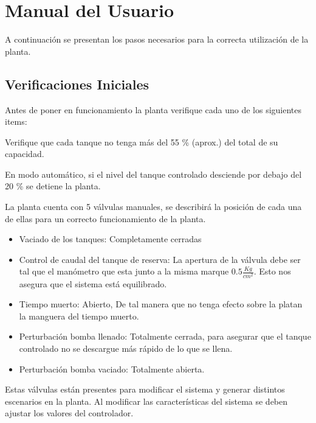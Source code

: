 \newpage
\section{Manual del Usuario}
\label{anexo:puestaEnMarcha}

A continuación se presentan los pasos necesarios para la
correcta utilización de la planta.

\subsection{Verificaciones Iniciales}
Antes de poner en funcionamiento la planta verifique cada uno de los siguientes 
items:


\begin{tcolorbox}[title=Nivel de agua]
Verifique que cada tanque no tenga más del 55 \% (aprox.) del total de su 
capacidad. 
\end {tcolorbox}
\begin{lattention}
En modo automático, si el nivel del tanque controlado desciende por debajo del 
20 \% se detiene la planta. 
\end{lattention}



\begin{tcolorbox}[title=Válvulas manuales]
La planta cuenta con 5 válvulas manuales, se describirá la posición de cada una 
de ellas para un correcto funcionamiento de la planta. 
 
 \begin{itemize}
  \item Vaciado de los tanques: Completamente cerradas
  \item Control de caudal del tanque de reserva:
  La apertura de la válvula debe ser tal que el manómetro que esta junto
  a la misma marque $0.5\frac{Kg}{cm^2}$. Esto nos asegura que el sistema está 
  equilibrado.
  \item Tiempo muerto: Abierto, De tal manera que no tenga efecto sobre la 
  platan la manguera del tiempo muerto.
  \item Perturbación bomba llenado: Totalmente cerrada, para asegurar que el 
  tanque controlado no se descargue más rápido de lo que se llena.
  \item Perturbación bomba vaciado: Totalmente abierta.
 \end{itemize}
 \tcblower
 Estas válvulas están presentes para modificar el sistema y generar distintos 
escenarios en la planta. Al modificar las características del sistema se deben 
ajustar los valores del controlador.
\end {tcolorbox}


